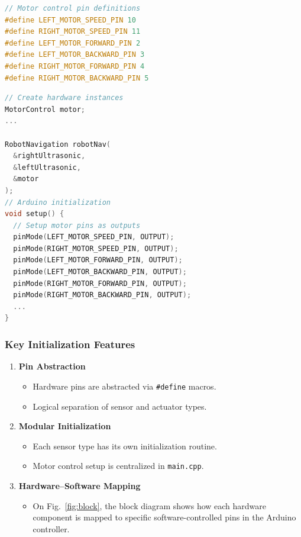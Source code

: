\documentclass[conference]{IEEEtran}
\begin{document}
\begin{lstlisting}[language=C++, caption=Pin definitions in MotorControl.h]
// Motor control pin definitions
#define LEFT_MOTOR_SPEED_PIN 10
#define RIGHT_MOTOR_SPEED_PIN 11
#define LEFT_MOTOR_FORWARD_PIN 2
#define LEFT_MOTOR_BACKWARD_PIN 3
#define RIGHT_MOTOR_FORWARD_PIN 4
#define RIGHT_MOTOR_BACKWARD_PIN 5
\end{lstlisting}

\begin{lstlisting}[language=C++, caption=Pins initialization in main.cpp]
// Create hardware instances
MotorControl motor;
...

RobotNavigation robotNav(
  &rightUltrasonic,
  &leftUltrasonic,
  &motor
);
// Arduino initialization
void setup() {
  // Setup motor pins as outputs
  pinMode(LEFT_MOTOR_SPEED_PIN, OUTPUT);
  pinMode(RIGHT_MOTOR_SPEED_PIN, OUTPUT);
  pinMode(LEFT_MOTOR_FORWARD_PIN, OUTPUT);
  pinMode(LEFT_MOTOR_BACKWARD_PIN, OUTPUT);
  pinMode(RIGHT_MOTOR_FORWARD_PIN, OUTPUT);
  pinMode(RIGHT_MOTOR_BACKWARD_PIN, OUTPUT);
  ...
}
\end{lstlisting}

\subsubsection*{Key Initialization Features}
\begin{enumerate}
  \item \textbf{Pin Abstraction}
    \begin{itemize}
      \item Hardware pins are abstracted via \verb|#define| macros.
      \item Logical separation of sensor and actuator types.
    \end{itemize}
  \item \textbf{Modular Initialization}
    \begin{itemize}
      \item Each sensor type has its own initialization routine.
      \item Motor control setup is centralized in \texttt{main.cpp}.
    \end{itemize}
  \item \textbf{Hardware–Software Mapping}
    \begin{itemize}
      \item On Fig.~\ref{fig:block}, the block diagram shows how each hardware component is mapped to specific software-controlled pins in the Arduino controller.
    \end{itemize}
\end{enumerate}
\end{document}
